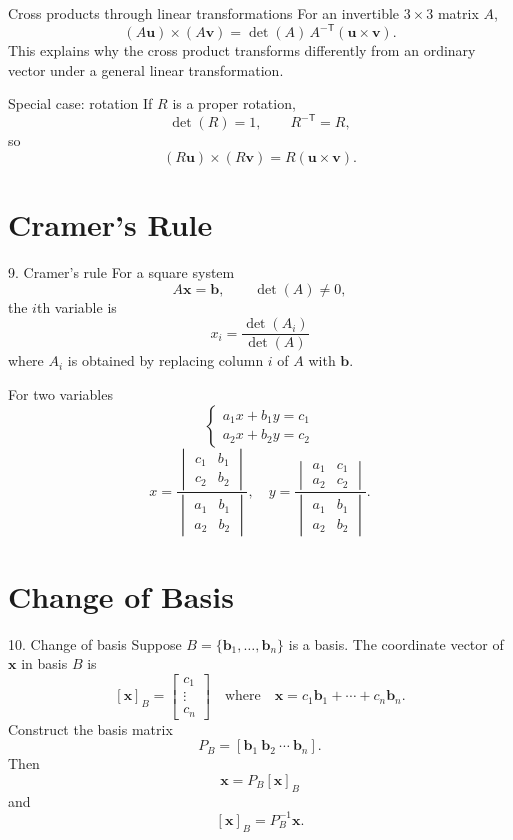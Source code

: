 \documentclass[aspectratio=169,11pt]{beamer}
\newcommand{\vect}[1]{\bm{#1}}
\begin{document}
\begin{frame}{Cross products through linear transformations}
For an invertible $3\times3$ matrix $A$,
\[
\boxed{(A\vect u)\times(A\vect v)
=\det(A)\,A^{-\mathsf T}(\vect u\times\vect v).}
\]
This explains why the cross product transforms differently from an ordinary vector under a general linear transformation.
\begin{block}{Special case: rotation}
If $R$ is a proper rotation,
\[
\det(R)=1,\qquad R^{-\mathsf T}=R,
\]
so
\[
(R\vect u)\times(R\vect v)=R(\vect u\times\vect v).
\]
\end{block}
\end{frame}

\section{Cramer's Rule}
\begin{frame}{9. Cramer's rule}
For a square system
\[
A\vect x=\vect b,\qquad \det(A)\neq0,
\]
the $i$th variable is
\[
\boxed{x_i=\frac{\det(A_i)}{\det(A)}}
\]
where $A_i$ is obtained by replacing column $i$ of $A$ with $\vect b$.
\begin{exampleblock}{For two variables}
\[
\begin{cases}
a_1x+b_1y=c_1\\
a_2x+b_2y=c_2
\end{cases}
\]
\[
x=\frac{\begin{vmatrix}c_1&b_1\\c_2&b_2\end{vmatrix}}
{\begin{vmatrix}a_1&b_1\\a_2&b_2\end{vmatrix}},
\quad
y=\frac{\begin{vmatrix}a_1&c_1\\a_2&c_2\end{vmatrix}}
{\begin{vmatrix}a_1&b_1\\a_2&b_2\end{vmatrix}}.
\]
\end{exampleblock}
\end{frame}


\section{Change of Basis}
\begin{frame}{10. Change of basis}
Suppose $B=\{\vect b_1,\ldots,\vect b_n\}$ is a basis. The coordinate vector of $\vect x$ in basis $B$ is
\[
[\vect x]_B=
\begin{bmatrix}c_1\\\vdots\\c_n\end{bmatrix}
\quad\text{where}\quad
\vect x=c_1\vect b_1+\cdots+c_n\vect b_n.
\]
Construct the basis matrix
\[
P_B=[\vect b_1\ \vect b_2\ \cdots\ \vect b_n].
\]
Then
\[
\boxed{\vect x=P_B[\vect x]_B}
\]
and
\[
\boxed{[\vect x]_B=P_B^{-1}\vect x}.
\]
\end{frame}
\end{document}
